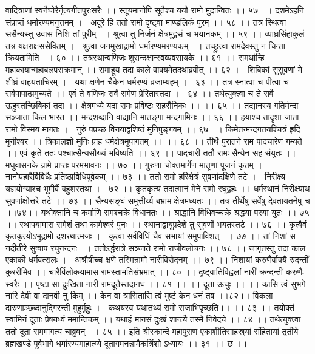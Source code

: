वादित्राणां स्वनैघोरैर्नृत्यगीतपुरःसरैः ।।
स्तूयमानोपि सूतैश्च ययौ रामो मुदान्वितः ।। ५७ ।।
दशमेऽहनि संप्राप्तं धर्मारण्यमनुत्तमम् ।।
अदूरे हि ततो रामो दृष्ट्वा माण्डलिकं पुरम् ।। ५८ ।।
तत्र स्थित्वा ससैन्यस्तु उवास निशि तां पुरीम् ।।
श्रुत्वा तु निर्जनं क्षेत्रमुद्वसं च भयानकम् ।। ५९ ।।
व्याघ्रसिंहाकुलं तत्र यक्षराक्षससेवितम् ।।
श्रुत्वा जनमुखाद्रामो धर्मारण्यमरण्यकम् ।।
तच्छ्रुत्वा रामदेवस्तु न चिन्ता क्रियतामिति ।। ६० ।।
तत्रस्थान्वणिजः शूरान्दक्षान्स्वव्यवसायके ।। ६१ ।।
समर्थान्हि महाकायान्महाबलपराक्रमान् ।।
समाहूय तदा काले वाक्यमेतदथाब्रवीत् ।। ६२ ।।
शिबिकां सुसुवणां मे शीघ्रं वाहयताचिरम् ।।
यथा क्षणेन चैकेन धर्मरण्यं व्रजाम्यहम् ।। ६३ ।।
तत्र स्नात्वा च पीत्वा च सर्वपापात्प्रमुच्यते ।।
एवं ते वणिजः सर्वै रामेण प्रेरितास्तदा ।। ६४ ।।
तथेत्युक्त्वा च ते सर्वे ऊहुस्तच्छिबिकां तदा ।।
क्षेत्रमध्ये यदा रामः प्रविष्टः सहसैनिकः ।। ।। ६५ ।।
तद्यानस्य गतिर्मन्दा सञ्जाता किल भारत ।।
मन्दशब्दानि वाद्यानि मातङ्गा मन्दगामिनः ।। ६६ ।।
हयाश्च तादृशा जाता रामो विस्मय मागतः ।।
गुरुं पप्रच्छ विनयाद्वशिष्ठं मुनिपुङ्गवम् ।। ६७ ।।
किमेतन्मन्दगतयश्चित्रं हृदि मुनीश्वर ।।
त्रिकालज्ञो मुनिः प्राह धर्मक्षेत्रमुपागतम् ।। ।। ६८ ।।
तीर्थे पुरातने राम पादचारेण गम्यते ।।
एवं कृते ततः पश्चात्सैन्यसौख्यं भविष्यति ।। ६९ ।।
पादचारी ततौ रामः सैन्येन सह संयुतः ।।
मधुवासनके ग्रामे प्राप्तः परमभावनः ।। ७० ।।
गुरुणा चोक्तमार्गेण मातॄणां पूजनं कृतम् ।।
नानोपहारैर्विविधैः प्रतिष्ठाविधिपूर्वकम् ।। ७३ ।।
ततो रामो हरिक्षेत्रं सुवर्णादक्षिणे तटे ।।
निरीक्ष्य यज्ञयोग्याश्च भूमीर्वै बहुशस्तथा ।। ७२ ।।
कृतकृत्यं तदात्मानं मेने रामो रघूद्वहः ।।
धर्मस्थानं निरीक्ष्याथ सुवर्णाक्षोत्तरे तटे ।। ७३ ।।
सैन्यसङ्घं समुत्तीर्य्य बभ्राम क्षेत्रमध्यतः ।।
तत्र तीर्थेषु सर्वेषु देवतायतनेषु च ।।७४।।
यथोक्तानि च कर्माणि रामश्चक्रे विधानतः ।।
श्राद्धानि विधिवच्चक्रे श्रद्धया परया युतः ।। ७५ ।।
स्थापयामास रामेशं तथा कामेश्वरं पुनः ।।
स्थानाद्वायुप्रदेशे तु सुवर्णो भयतस्तटे ।। ७६ ।।
कृत्वैवं कृतकृत्योऽभूद्रामो दशरथात्मजः ।।
कृत्वा सर्वविधिं चैव सभायां समुपाविशत् ।। ७७ ।।
तां निशां स नदीतीरे सुष्वाप रघुनन्दनः ।।
ततोऽर्द्धरात्रे सञ्जाते रामो राजीवलोचनः ।। ७८ ।।
जागृतस्तु तदा काल एकाकी धर्मवत्सलः ।।
अश्रौषीच्च क्षणे तस्मिन्रामो नारीविरोदनम् ।। ७९ ।।
निशायां करुणैर्वाक्यै रुदन्तीं कुररीमिव ।।
चारैर्विलोकयामास रामस्तामतिसंभ्रमात् ।। ८० ।।
दृष्ट्वातिविह्वलां नारीं क्रन्दन्तीं करुणैः स्वरैः ।।
पृष्टा सा दुःखिता नारी रामदूतैस्तदानघ ।। ८१ ।।
।। दूता ऊचुः ।। ।।
कासि त्वं सुभगे नारि देवी वा दानवी नु किम् ।।
केन वा त्रासितासि त्वं मुष्टं केन धनं तव ।।८२।।
विकला दारुणाञ्छब्दानुद्गिरन्ती मुहुर्मुहुः ।।
कथयस्व यथातथ्यं रामो राजाभिपृच्छति।। ।। ८३ ।।
तयोक्तं स्वामिनं दूताः प्रेषयध्वं ममान्तिकम् ।।
यथाहं मानसं दुःखं शान्त्यै तस्मै निवेदये ।। ८४ ।।
तथेत्युक्त्वा ततो दूता राममागत्य चाब्रुवन् ।। ८५ ।।
इति श्रीस्कान्दे महापुराण एकाशीतिसाहस्र्यां संहितायां तृतीये ब्रह्मखण्डे पूर्वभागे धर्मारण्यमाहात्म्ये दूतागमनन्नामैकत्रिंशो ऽध्यायः ।। ३१ ।। छ ।।

